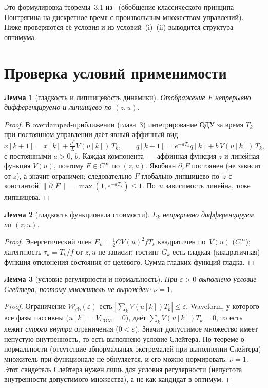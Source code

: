 \documentclass[12pt,a4paper]{article}
\theoremstyle{plain}
\newtheorem{lemma}{Лемма}
\theoremstyle{definition}\newtheorem{remark}{Замечание}
\newcommand{\Wcb}{\mathcal{W}_{\mathrm{cb}}}
\newcommand{\xbar}{\bar{x}}
\begin{document}
\noindent Это формулировка теоремы~3.1 из~\cite{paruchuri2019_discrete_pmp} (обобщение
классического принципа Понтрягина на дискретное время с произвольным множеством
управлений). Ниже проверяются её условия и из условий~(i)--(ii) выводится структура
оптимума.


\section{Проверка условий применимости}

\begin{lemma}[гладкость и липшицевость динамики]\label{lem:lip}
Отображение $F$ непрерывно дифференцируемо и липшицево по $(z,u)$.
\end{lemma}
\begin{proof}
В overdamped-приближении (глава~3) интегрирование ОДУ за время $T_k$ при постоянном
управлении даёт явный аффинный вид
\begin{equation}\label{eq:Fexplicit}
  \xbar[k+1]=\xbar[k]+\tfrac{\mu^*}{L}V(u[k])\,T_k,\qquad
  q[k+1]=e^{-a T_k}q[k]+b\,V(u[k])\,T_k,
\end{equation}
с постоянными $a>0$, $b$. Каждая компонента~--- аффинная функция $z$ и линейная
функция $V(u)$, поэтому $F\in C^{\infty}$ по $(z,u)$. Якобиан $\partial_z F$ постоянен
(не зависит от $z$), а значит ограничен; следовательно $F$ глобально липшицево по~$z$
с константой $\|\partial_z F\|=\max(1,e^{-aT_k})\le1$. По~$u$ зависимость линейна,
тоже липшицева. \end{proof}

\begin{lemma}[гладкость функционала стоимости]\label{lem:cost}
$L_k$ непрерывно дифференцируем по $(z,u)$.
\end{lemma}
\begin{proof}
Энергетический член $E_k=\tfrac12 C V(u)^2 f T_k$ квадратичен по~$V(u)$
($C^{\infty}$); латентность $\tau_k=T_k/f$ от $z,u$ не зависит; гостинг $G_k$ есть
гладкая (квадратичная) функция отклонения состояния от целевого. Сумма гладких
функций гладка. \end{proof}

\begin{lemma}[условие регулярности и нормальность]\label{lem:slater}
При $\varepsilon>0$ выполнено условие Слейтера, поэтому множитель не вырожден:
$\nu=1$.
\end{lemma}
\begin{proof}
Ограничение $\Wcb(\varepsilon)$ есть $|\sum_k V(u[k])T_k|\le\varepsilon$. Waveform,
у которого все фазы пассивны ($u[k]=V_{\mathrm{COM}}=0$), даёт $\sum_k V(u[k])T_k=0$,
то есть лежит \emph{строго внутри} ограничения ($0<\varepsilon$). Значит допустимое
множество имеет непустую внутренность, то есть выполнено условие Слейтера. По теореме о нормальности
(отсутствие абнормальных экстремалей при выполнении Слейтера) множитель при
функционале не обнуляется, и его можно нормировать: $\nu=1$. Этот свидетель
Слейтера нужен лишь для условия регулярности (непустота внутренности допустимого
множества), а не как кандидат в оптимум. \end{proof}
\end{document}

